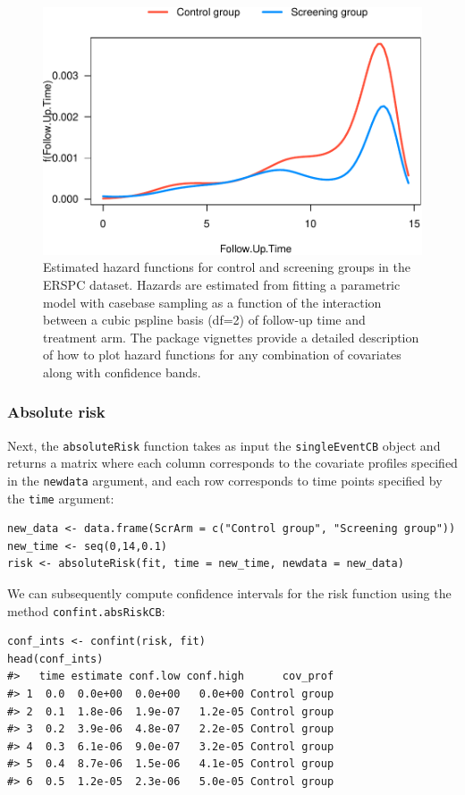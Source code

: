 \begin{figure}[ht]
\includegraphics[width=\textwidth,keepaspectratio=true]{./cs1hazard-1} \caption{Estimated hazard functions for control and screening groups in the ERSPC dataset. Hazards are estimated from fitting a parametric model with casebase sampling as a function of the interaction between a cubic pspline basis (df=2) of follow-up time and treatment arm. The package vignettes provide a detailed description of how to plot hazard functions for any combination of covariates along with confidence bands.}\label{fig:cs1hazard}
\end{figure}

\hypertarget{absolute-risk}{%
\subsubsection{Absolute risk}\label{absolute-risk}}

Next, the \texttt{absoluteRisk} function takes as input the \texttt{singleEventCB} object and returns a matrix where each column corresponds to the covariate profiles specified in the \texttt{newdata} argument, and each row corresponds to time points specified by the \texttt{time} argument:

\begin{verbatim}
new_data <- data.frame(ScrArm = c("Control group", "Screening group"))
new_time <- seq(0,14,0.1)
risk <- absoluteRisk(fit, time = new_time, newdata = new_data)
\end{verbatim}

We can subsequently compute confidence intervals for the risk function using
the method \texttt{confint.absRiskCB}:

\begin{verbatim}
conf_ints <- confint(risk, fit)
head(conf_ints)
#>   time estimate conf.low conf.high      cov_prof
#> 1  0.0  0.0e+00  0.0e+00   0.0e+00 Control group
#> 2  0.1  1.8e-06  1.9e-07   1.2e-05 Control group
#> 3  0.2  3.9e-06  4.8e-07   2.2e-05 Control group
#> 4  0.3  6.1e-06  9.0e-07   3.2e-05 Control group
#> 5  0.4  8.7e-06  1.5e-06   4.1e-05 Control group
#> 6  0.5  1.2e-05  2.3e-06   5.0e-05 Control group
\end{verbatim}

